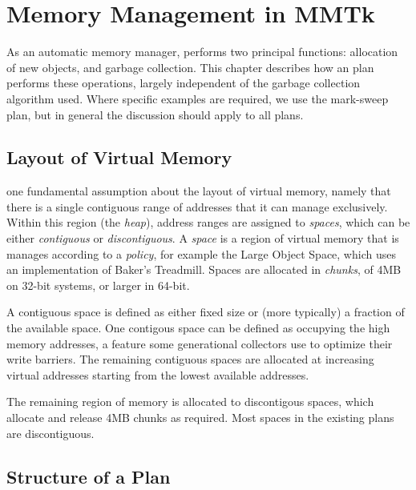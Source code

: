 \chapter{Memory Management in MMTk}

As an automatic memory manager, \mmtk performs two principal functions: 
allocation of new objects, and garbage collection.  This chapter describes
how an \mmtk plan performs these operations, largely independent of the 
garbage collection algorithm used.  Where specific examples are required,
we use the mark-sweep plan, but in general the discussion should apply to all
\mmtk plans.

\section{Layout of Virtual Memory}

\mmtk one fundamental assumption about the layout of virtual memory, namely that
there is a single contiguous range of addresses that it can manage exclusively. 
Within this region (the \emph{heap}), address ranges are assigned to
\emph{spaces}, which can be either \emph{contiguous} or \emph{discontiguous}.  A
\emph{space} is a region of virtual memory that is manages according to a
\emph{policy}, for example the Large Object Space, which uses an
implementation of Baker's Treadmill.  Spaces are allocated in \emph{chunks}, of
4MB on 32-bit systems, or larger in 64-bit.

A contiguous space is defined as either fixed size or (more typically) a
fraction of the available space.  One contigous space can be defined as occupying the
high memory addresses, a feature some generational collectors use to optimize
their write barriers.  The remaining contiguous spaces are allocated at
increasing virtual addresses starting from the lowest available addresses.

The remaining region of memory is allocated to discontigous spaces, which
allocate and release 4MB chunks as required.  Most spaces in the existing \mmtk
plans are discontiguous.


\section{Structure of a Plan}


